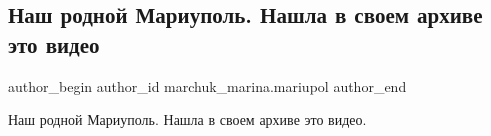  
 
 
 
 

\subsection{Наш родной Мариуполь. Нашла в своем архиве это видео}
\label{sec:12_12_2022.fb.marchuk_marina.mariupol.1.nash_rodnoi_mariupol}

\ifcmt
 author_begin
   author_id marchuk_marina.mariupol
 author_end
\fi

Наш родной Мариуполь. Нашла в своем архиве это видео.
